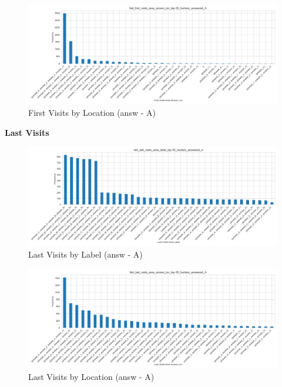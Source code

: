 \documentclass{article}
\begin{document}
\begin{figure}[H]
    \centering
    \includegraphics[width=1\linewidth]{plots/visits_hists/hist_first_visits_area_screen_loc_top-35_hunters_answered_A.png}
    \caption{First Visits by Location (answ - A)}
    \label{fig:sl_h}
\end{figure}


\newpage
\textbf{Last Visits}
\begin{figure}[H]
    \centering
    \includegraphics[width=1\linewidth]{plots/visits_hists/hist_last_visits_area_label_top-35_hunters_answered_A.png}
    \caption{Last Visits by Label (answ - A)}
    \label{fig:sl_h}
\end{figure}




\begin{figure}[H]
    \centering
    \includegraphics[width=1\linewidth]{plots/visits_hists/hist_last_visits_area_screen_loc_top-35_hunters_answered_A.png}
    \caption{Last Visits by Location (answ - A)}
    \label{fig:sl_h}
\end{figure}
\end{document}
